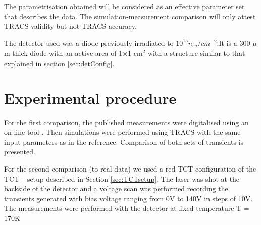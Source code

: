 The parametrisation obtained will be considered as an effective parameter set that describes the data. The simulation-measurement comparison will only attest TRACS validity but not TRACS accuracy.

The detector used was a diode previously irradiated to $10^{15} n_{eq}/cm^{-2}$.It is a 300 $\mu$m thick diode with an active area of 1$\times$1 cm$^{2}$ with a structure similar to that explained in section \ref{sec:detConfig}. %


\section{Experimental procedure} %
\label{sec:ExpProc}

For the  first comparison, the published measurements \cite{Pholsen} were digitalised using an on-line tool \cite{digitiser}. Then simulations were performed using TRACS with the same input parameters as in the reference. Comparison of both sets of transients is presented.

For the second comparison (to real data) we used a red-TCT configuration of the TCT+ setup described in Section \ref{sec:TCTsetup}. The laser was shot at the backside of the detector and a voltage scan was performed recording the transients generated with bias voltage ranging from 0V to 140V in steps of 10V. The measurements were performed with the detector at fixed temperature T = 170K



